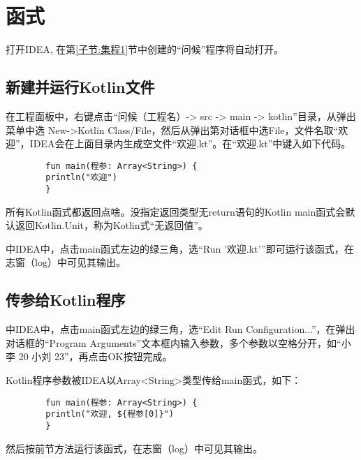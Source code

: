 \chapter{函式}

打开IDEA, 在第\ref{子节:集程1}节中创建的“问候”程序将自动打开。
\section{新建并运行Kotlin文件}
在工程面板中，右键点击“问候（工程名）-> src -> main -> kotlin”目录，从弹出菜单中选 New->Kotlin Class/File，然后从弹出第对话框中选File，文件名取“欢迎”，IDEA会在上面目录内生成空文件“欢迎.kt”。在“欢迎.kt”中键入如下代码。

    \begin{verbatim}
        fun main(程参: Array<String>) {
        println("欢迎")
        }

    \end{verbatim}

所有Kotlin函式都返回点啥。没指定返回类型无return语句的Kotlin main函式会默认返回Kotlin.Unit，称为Kotlin式“无返回值”。

中IDEA中，点击main函式左边的绿三角，选“Run '欢迎.kt'”即可运行该函式，在志窗（log）中可见其输出。

\section{传参给Kotlin程序}
中IDEA中，点击main函式左边的绿三角，选“Edit Run Configuration...”，在弹出对话框的“Program Arguments”文本框内输入参数，多个参数以空格分开，如“小李 20 小刘 23”，再点击OK按钮完成。

Kotlin程序参数被IDEA以Array<String>类型传给main函式，如下：
    \begin{verbatim}
        fun main(程参: Array<String>) {
        println("欢迎, ${程参[0]}")
        }

    \end{verbatim}


然后按前节方法运行该函式，在志窗（log）中可见其输出。

